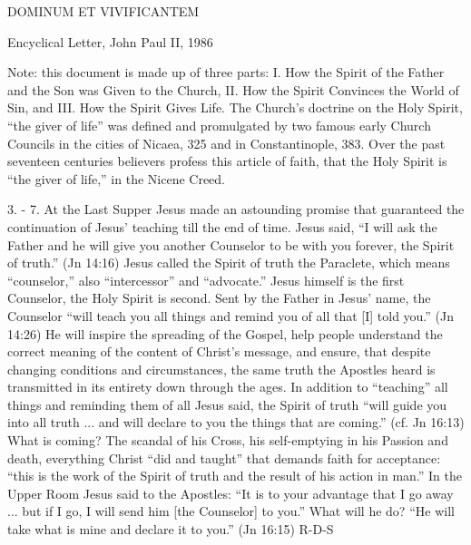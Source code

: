 \documentclass[oneside]{book}
\begin{document}
DOMINUM ET VIVIFICANTEM

Encyclical Letter, John Paul II, 1986


Note: this document is made up of three parts: I. How the Spirit of the Father
and the Son was Given to the Church, II. How the Spirit Convinces the World of
Sin, and III. How the Spirit Gives Life. The Church's doctrine on the Holy
Spirit, ``the giver of life'' was defined and promulgated by two famous early
Church Councils in the cities of Nicaea, 325 and in Constantinople, 383. Over
the past seventeen centuries believers profess this article of faith, that the
Holy Spirit is ``the giver of life,'' in the Nicene Creed.

3. - 7. At the Last Supper Jesus made an astounding promise that guaranteed the
continuation of Jesus' teaching till the end of time. Jesus said, ``I will ask
the Father and he will give you another Counselor to be with you forever, the
Spirit of truth.'' (Jn 14:16) Jesus called the Spirit of truth the Paraclete,
which means ``counselor,'' also ``intercessor'' and ``advocate.'' Jesus himself
is the first Counselor, the Holy Spirit is second. Sent by the Father in Jesus'
name, the Counselor ``will teach you all things and remind you of all that [I]
told you.'' (Jn 14:26) He will inspire the spreading of the Gospel, help people
understand the correct meaning of the content of Christ's message, and ensure,
that despite changing conditions and circumstances, the same truth the Apostles
heard is transmitted in its entirety down through the ages. In addition to
``teaching'' all things and reminding them of all Jesus said, the Spirit of
truth ``will guide you into all truth ... and will declare to you the things
that are coming.'' (cf. Jn 16:13) What is coming? The scandal of his Cross, his
self-emptying in his Passion and death, everything Christ ``did and taught''
that demands faith for acceptance: ``this is the work of the Spirit of truth and
the result of his action in man.'' In the Upper Room Jesus said to the Apostles:
``It is to your advantage that I go away ... but if I go, I will send him [the
Counselor] to you.'' What will he do? ``He will take what is mine and declare it
to you.'' (Jn 16:15)
R-D-S
\end{document}
